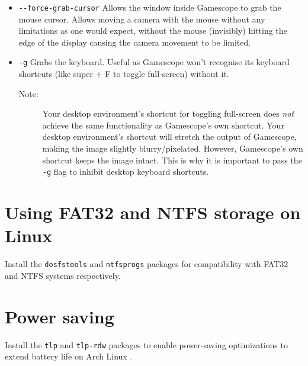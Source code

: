\documentclass[a4paper]{article}
\begin{document}
\begin{itemize}
    \item \lstinline|--force-grab-cursor| Allows the window inside Gamescope to grab the mouse cursor. Allows moving a camera with the mouse without any limitations as one would expect, without the mouse (invisibly) hitting the edge of the display causing the camera movement to be limited.
    \item \lstinline|-g| Grabs the keyboard. Useful as Gamescope won't recognise its keyboard shortcuts (like super + F to toggle full-screen) without it.
    \begin{description}
        \item[Note:] Your desktop environment's shortcut for toggling full-screen does \emph{not} achieve the same functionality as Gamescope's own shortcut. Your desktop environment's shortcut will stretch the output of Gamescope, making the image slightly blurry/pixelated. However, Gamescope's own shortcut keeps the image intact. This is why it is important to pass the \lstinline|-g| flag to inhibit desktop keyboard shortcuts.
    \end{description}
\end{itemize}

\section{Using FAT32 and NTFS storage on Linux}

Install the \lstinline|dosfstools| and \lstinline|ntfsprogs| packages for compatibility with FAT32 and NTFS systems respectively.

\section{Power saving}

Install the \lstinline|tlp| and \lstinline|tlp-rdw| packages to enable power-saving optimizations to extend battery life on Arch Linux \cite{tlp-installation}.



\end{document}
